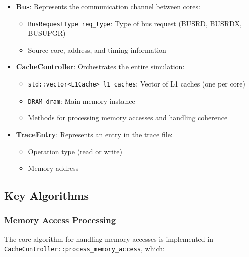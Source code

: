 \documentclass[11pt,a4paper]{article}
\begin{document}
\begin{itemize}[leftmargin=*]
        \item \textbf{Bus}: Represents the communication channel between cores:
        \begin{itemize}
            \item \texttt{BusRequestType req\_type}: Type of bus request (BUSRD, BUSRDX, BUSUPGR)
            \item Source core, address, and timing information
        \end{itemize}
        
        \item \textbf{CacheController}: Orchestrates the entire simulation:
        \begin{itemize}
            \item \texttt{std::vector<L1Cache> l1\_caches}: Vector of L1 caches (one per core)
            \item \texttt{DRAM dram}: Main memory instance
            \item Methods for processing memory accesses and handling coherence
        \end{itemize}
        
        \item \textbf{TraceEntry}: Represents an entry in the trace file:
        \begin{itemize}
            \item Operation type (read or write)
            \item Memory address
        \end{itemize}
    \end{itemize}

    \subsection{Key Algorithms}

    \subsubsection{Memory Access Processing}
    The core algorithm for handling memory accesses is implemented in \texttt{CacheController::process\_memory\_access}, which:
\end{document}
